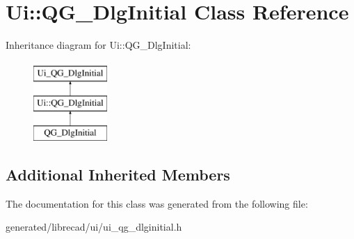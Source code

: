 \hypertarget{classUi_1_1QG__DlgInitial}{\section{Ui\-:\-:Q\-G\-\_\-\-Dlg\-Initial Class Reference}
\label{classUi_1_1QG__DlgInitial}
}
Inheritance diagram for Ui\-:\-:Q\-G\-\_\-\-Dlg\-Initial\-:\begin{figure}[H]
\begin{center}
\leavevmode
\includegraphics[height=3.000000cm]{classUi_1_1QG__DlgInitial}
\end{center}
\end{figure}
\subsection*{Additional Inherited Members}


The documentation for this class was generated from the following file\-:\begin{DoxyCompactItemize}
\item 
generated/librecad/ui/ui\-\_\-qg\-\_\-dlginitial.\-h\end{DoxyCompactItemize}
